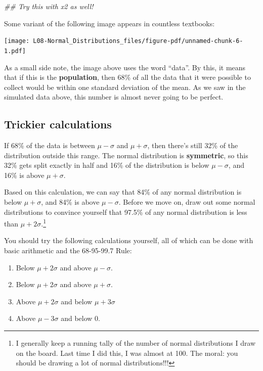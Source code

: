 \documentclass[
  letterpaper,
  DIV=11,
  numbers=noendperiod,
  oneside]{scrreprt}
\newenvironment{Shaded}{\begin{snugshade}}{\end{snugshade}}
\newcommand{\DocumentationTok}[1]{\textcolor[rgb]{0.37,0.37,0.37}{\textit{#1}}}
\providecommand{\tightlist}{%
  \setlength{\itemsep}{0pt}\setlength{\parskip}{0pt}}\usepackage{longtable,booktabs,array}
\begin{document}
\begin{Shaded}
\begin{Highlighting}[]
\DocumentationTok{\#\# Try this with x2 as well!}
\end{Highlighting}
\end{Shaded}

Some variant of the following image appears in countless textbooks:

\texttt{[image: L08-Normal\_Distributions\_files/figure-pdf/unnamed-chunk-6-1.pdf]}

As a small side note, the image above uses the word ``data''. By this,
it means that if this is the \textbf{population}, then 68\% of all the
data that it were possible to collect would be within one standard
deviation of the mean. As we saw in the simulated data above, this
number is almost never going to be perfect.

\hypertarget{trickier-calculations}{%
\subsection{Trickier calculations}\label{trickier-calculations}}

If 68\% of the data is between \(\mu - \sigma\) and \(\mu + \sigma\),
then there's still 32\% of the distribution outside this range. The
normal distribution is \textbf{symmetric}, so this 32\% gets split
exactly in half and 16\% of the distribution is below \(\mu - \sigma\),
and 16\% is above \(\mu + \sigma\).

Based on this calculation, we can say that 84\% of any normal
distribution is below \(\mu + \sigma\), and 84\% is above
\(\mu - \sigma\). Before we move on, draw out some normal distributions
to convince yourself that 97.5\% of any normal distribution is less than
\(\mu + 2\sigma\).\footnote{I generally keep a running tally of the
  number of normal distributions I draw on the board. Last time I did
  this, I was almost at 100. The moral: you should be drawing a lot of
  normal distributions!!!}

You should try the following calculations yourself, all of which can be
done with basic arithmetic and the 68-95-99.7 Rule:

\begin{enumerate}
\def\labelenumi{\arabic{enumi}.}
\tightlist
\item
  Below \(\mu+2\sigma\) and above \(\mu-\sigma\).
\item
  Below \(\mu+2\sigma\) and above \(\mu+\sigma\).
\item
  Above \(\mu + 2\sigma\) and below \(\mu + 3\sigma\)
\item
  Above \(\mu - 3\sigma\) and below 0.
\end{enumerate}
\end{document}
